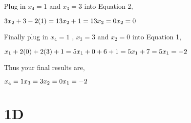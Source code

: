 \documentclass{article}
\begin{document}
\raggedright Plug in \begin{math} x_4 = 1 \end{math} and \begin{math} x_3 = 3 \end{math}  into Equation 2, \newline
    
    \begin{math}
        3x_2 + 3 - 2(1) = 1 \newline
        3x_2 + 1  = 1 \newline
        3x_2 = 0 \newline
        x_2 = 0 \newline  
    \end{math}

\raggedright Finally plug in \begin{math} x_4 = 1 \end{math} , \begin{math} x_3 = 3 \end{math} and \begin{math} x_2 = 0 \end{math} into Equation 1, \newline

    \begin{math}
        x_1 + 2(0) + 2(3) + 1 = 5 \newline
        x_1 + 0 + 6 + 1 = 5 \newline
        x_1 + 7 = 5 \newline
        x_1 = -2 \newline
    \end{math}

    \raggedright Thus your final results are, \newline

    \begin{math}
        x_4 = 1 \newline
        x_3 = 3 \newline
        x_2 = 0 \newline
        x_1 = -2 
    \end{math}


    \section*{1D}   

    \setcounter{equation}{0} %
    
\end{document}
